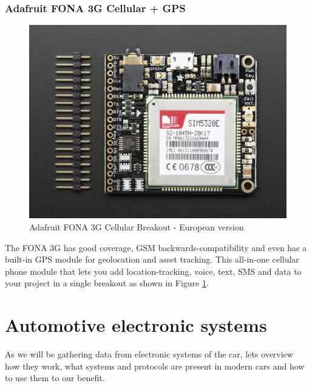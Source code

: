 \subsubsection{Adafruit FONA 3G Cellular + GPS} %
\label{ssub:adafruit_fona_3g_cellular_gps}
\begin{figure}[H]
\begin{center}
\captionsetup{font=small}
\includegraphics[scale=0.85]{pics/3g.jpg}
\caption{Adafruit FONA 3G Cellular Breakout - European version\cite{ada_3g}}
\label{fig:3g}
\end{center}
\end{figure}
The FONA 3G has good coverage, GSM backwards-compatibility and even has a built-in GPS module for geolocation and asset tracking. This all-in-one cellular phone module that lets you add location-tracking, voice, text, SMS and data to your project in a single breakout as shown in Figure \ref{fig:3g}.\cite{ada_3g}


\section{Automotive electronic systems}
As we will be gathering data from electronic systems of the car, lets overview how they work, what systems and protocols are present in modern cars and how to use them to our benefit.
